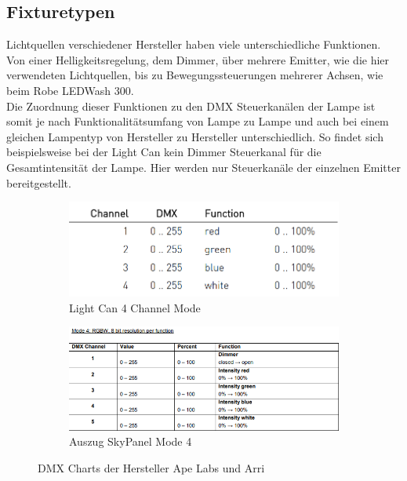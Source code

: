 \documentclass[11pt]{scrartcl}
\begin{document}
\subsection{Fixturetypen}
Lichtquellen verschiedener Hersteller haben viele unterschiedliche Funktionen. Von einer Helligkeitsregelung, dem Dimmer, über mehrere Emitter, wie
die hier verwendeten Lichtquellen, bis zu Bewegungssteuerungen mehrerer Achsen, wie beim Robe LEDWash 300.\\
Die Zuordnung dieser Funktionen zu den DMX Steuerkanälen der Lampe ist somit je nach Funktionalitätsumfang von Lampe zu Lampe und auch bei einem gleichen
Lampentyp von Hersteller zu Hersteller unterschiedlich. So findet sich beispielsweise bei der Light Can kein Dimmer Steuerkanal für die Gesamtintensität
der Lampe. Hier werden nur Steuerkanäle der einzelnen Emitter bereitgestellt.
\begin{figure}[H]
    \centering
    \begin{subfigure}[b]{.49\textwidth}
        \includegraphics[width=\textwidth]{images/dmx_chart_light_can_4_channel_mode.png}
        \caption{Light Can 4 Channel Mode \cite{lightCanDMX}}
    \end{subfigure}
    \hfill 
    \begin{subfigure}[b]{.49\textwidth}
        \includegraphics[width=\textwidth]{images/dmx_chart_skypanel_mode_4.png}
        \caption{Auszug SkyPanel Mode 4 \cite{skypanelDMX}}
    \end{subfigure}
    \caption{DMX Charts der Hersteller Ape Labs und Arri}
\end{figure}
\end{document}

